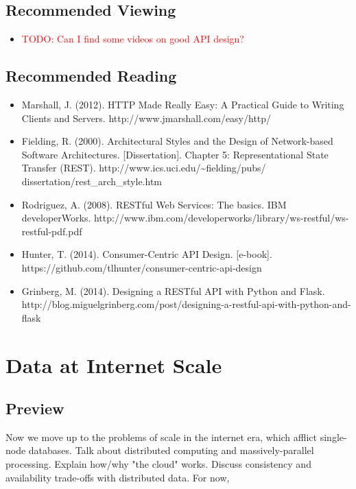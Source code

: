 \documentclass[11pt]{book}
\newcommand{\todo}[1]{\textcolor{red}{TODO: #1}} %
\begin{document}
\section*{Recommended Viewing}
\begin{itemize}
    \item \todo{Can I find some videos on good API design?}
\end{itemize}

\section*{Recommended Reading}
\begin{itemize}
    \item Marshall, J. (2012).  HTTP Made Really Easy: A Practical Guide to Writing Clients and Servers.  http://www.jmarshall.com/easy/http/
    \item Fielding, R. (2000). Architectural Styles and the Design of Network-based Software Architectures. [Dissertation]. Chapter 5: Representational State Transfer (REST). http://www.ics.uci.edu/\~{}fielding/pubs/ dissertation/rest\_arch\_style.htm
    \item Rodriguez, A. (2008). RESTful Web Services: The basics.  IBM developerWorks. http://www.ibm.com/developerworks/library/ws-restful/ws-restful-pdf.pdf
    \item Hunter, T. (2014). Consumer-Centric API Design. [e-book]. \\https://github.com/tlhunter/consumer-centric-api-design
    \item Grinberg, M. (2014). Designing a RESTful API with Python and Flask. http://blog.miguelgrinberg.com/post/designing-a-restful-api-with-python-and-flask
\end{itemize}









\chapter{Data at Internet Scale}

\section*{Preview}

Now we move up to the problems of scale in the internet era, which afflict single-node databases.  Talk about distributed computing and massively-parallel processing.  Explain how/why "the cloud" works.  Discuss consistency and availability trade-offs with distributed data.  For now, 
\end{document}
